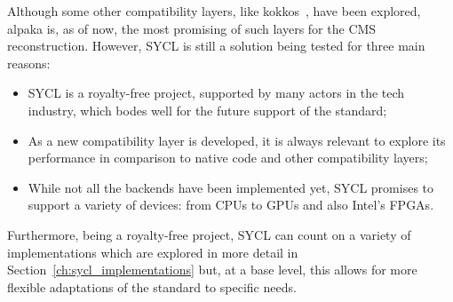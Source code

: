 Although some other compatibility layers, like kokkos~\cite{kokkos}, have been explored, alpaka is, as of now, the most promising of such layers for the CMS reconstruction. However, SYCL is still a solution being tested for three main reasons:
\begin{itemize}
    \item SYCL is a royalty-free project, supported by many actors in the tech industry, which bodes well for the future support of the standard;
    \item As a new compatibility layer is developed, it is always relevant to explore its performance in comparison to native code and other compatibility layers;
    \item While not all the backends have been implemented yet, SYCL promises to support a variety of devices: from CPUs to GPUs and also Intel's FPGAs.
\end{itemize}
Furthermore, being a royalty-free project, SYCL can count on a variety of implementations which are explored in more detail in Section~\ref{ch:sycl_implementations} but, at a base level, this allows for more flexible adaptations of the standard to specific needs. 